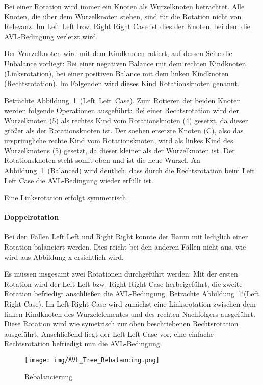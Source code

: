 Bei einer Rotation wird immer ein Knoten als Wurzelknoten betrachtet.
Alle Knoten, die über dem Wurzelknoten stehen, sind für die Rotation nicht von
Relevanz.
Im Left Left bzw. Right Right Case ist dies der Knoten,
bei dem die AVL-Bedingung verletzt wird.

Der Wurzelknoten wird mit dem Kindknoten rotiert, auf dessen Seite die
Unbalance vorliegt:
Bei einer negativen Balance mit dem rechten Kindknoten (Linksrotation),
bei einer positiven Balance mit dem linken Kindknoten (Rechtsrotation).
Im Folgenden wird dieses Kind Rotationsknoten genannt.

Betrachte Abbildung~\ref{fig:AVL-Cases}~(Left~Left~Case).
Zum Rotieren der beiden Knoten werden folgende Operationen ausgeführt:
Bei einer Rechtsrotation wird der Wurzelknoten (5) als rechtes Kind vom
Rotationsknoten (4) gesetzt, da dieser größer als der Rotationsknoten ist.
Der soeben ersetzte Knoten (C), also das ursprüngliche rechte Kind vom
Rotationsknoten, wird als linkes Kind des Wurzelknotens (5) gesetzt,
da dieser kleiner als der Wurzelknoten ist.
Der Rotationsknoten steht somit oben und ist die neue Wurzel.
An Abbildung~\ref{fig:AVL-Cases}~(Balanced) wird deutlich, dass durch die
Rechtsrotation beim Left Left Case die AVL-Bedingung wieder erfüllt ist.

Eine Linksrotation erfolgt symmetrisch.

\paragraph{Doppelrotation}

Bei den Fällen Left Left und Right Right konnte der Baum mit lediglich
einer Rotation balanciert werden.
Dies reicht bei den anderen Fällen nicht aus, wie wird aus Abbildung x %
ersichtlich wird.

Es müssen insgesamt zwei Rotationen durchgeführt werden:
Mit der ersten Rotation wird der Left Left bzw. Right Right Case
herbeigeführt, die zweite Rotation befriedigt anschließen die AVL-Bedingung.
Betrachte Abbildung~\ref{fig:AVL-Cases}`(Left Right Case).
Im Left Right Case wird zunächst eine Linksrotation zwischen dem linken
Kindknoten des Wurzelelementes und des rechten Nachfolgers ausgeführt.
Diese Rotation wird wie symetrisch zur oben beschriebenen Rechtsrotation ausgeführt.
Anschließend liegt der Left Left Case vor, eine einfache Rechtsrotation
befriedigt nun die AVL-Bedingung.


\begin{figure}
    \centering
    \texttt{[image: img/AVL\_Tree\_Rebalancing.png]}
    \caption{Rebalancierung}
    \label{fig:AVL-Cases}
\end{figure}
